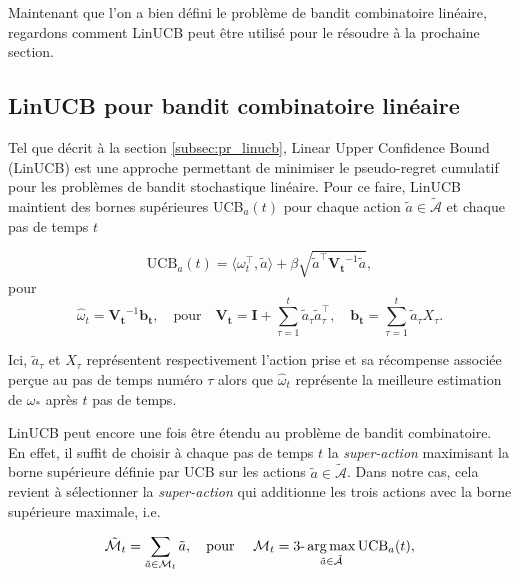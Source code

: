 Maintenant que l'on a bien défini le problème de bandit combinatoire linéaire,
regardons comment LinUCB peut être utilisé pour le résoudre à la prochaine section.

\subsection{LinUCB pour bandit combinatoire linéaire}

Tel que décrit à la section \ref{subsec:pr_linucb}, 
Linear Upper Confidence Bound (LinUCB) est une approche permettant 
de minimiser le pseudo-regret cumulatif pour les problèmes de bandit stochastique linéaire.
Pour ce faire, LinUCB maintient des bornes supérieures UCB$_a(t)$ pour chaque action 
$\tilde{a} \in \tilde{\mathcal{A}}$ et chaque pas de temps $t$

\begin{equation}
    \text{UCB}_a(t) = \langle \omega_t^\top, \tilde{a} \rangle +  \beta\sqrt{\tilde{a}^\top \mathbf{V_t}^{-1} \tilde{a}},
    \label{eq:linUCB}
\end{equation}
pour
\begin{equation*}
    \hat{\omega}_t = \mathbf{V_t}^{-1}\mathbf{b_t}, \quad \text{pour} \quad \mathbf{V_t} = \mathbf{I} + \displaystyle \sum_{\tau=1}^t \tilde{a}_{\tau} \tilde{a}_{\tau}^\top, \quad \mathbf{b_t} = \displaystyle \sum_{\tau=1}^t \tilde{a}_{\tau} X_\tau.
\end{equation*}

Ici, $\tilde{a}_\tau$ et $X_\tau$ représentent respectivement l'action prise et 
sa récompense associée perçue au pas de temps numéro $\tau$ alors que $\hat{\omega}_t$
représente la meilleure estimation de $\omega_*$ après $t$ pas de temps.

LinUCB peut encore une fois être étendu au problème de bandit combinatoire.
En effet, il suffit de choisir à chaque pas de temps $t$ la \textit{super-action}
maximisant la borne supérieure définie par UCB sur les actions $\tilde{a} \in \tilde{\mathcal{A}}$.
Dans notre cas, cela revient à sélectionner la \textit{super-action} qui additionne les trois actions
avec la borne supérieure maximale, i.e.

\begin{equation}
    \tilde{\mathcal{M}}_t = \sum_{\tilde{a} \in \mathcal{M}_t} \tilde{a}, \quad\text{pour } \quad \mathcal{M}_t = \text{3-}\operatorname*{arg\,max}_{\tilde{a} \in \tilde{\mathcal{A}}} \text{UCB}_a(t),
    \label{eq:linucb_combi_rule}
\end{equation}

